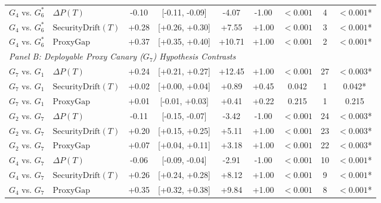 \documentclass[conference]{IEEEtran}
\begin{document}
\begin{table}[t]
\begin{tabular}{llccccccc}
$G_4$ vs. $G_6^*$ & $\Delta P(T)$ & -0.10 & [-0.11, -0.09] & -4.07 & -1.00 & $<0.001$ & 4 & \textbf{$<0.001$}* \\
$G_4$ vs. $G_6^*$ & $\text{SecurityDrift}(T)$ & +0.28 & [+0.26, +0.30] & +7.55 & +1.00 & $<0.001$ & 3 & \textbf{$<0.001$}* \\
$G_4$ vs. $G_6^*$ & $\text{ProxyGap}$ & +0.37 & [+0.35, +0.40] & +10.71 & +1.00 & $<0.001$ & 2 & \textbf{$<0.001$}* \\
\midrule
\multicolumn{9}{l}{\textit{Panel B: Deployable Proxy Canary ($G_7$) Hypothesis Contrasts}} \\
\midrule
$G_7$ vs. $G_1$ & $\Delta P(T)$ & +0.24 & [+0.21, +0.27] & +12.45 & +1.00 & $<0.001$ & 27 & \textbf{$<0.003$}* \\
$G_7$ vs. $G_1$ & $\text{SecurityDrift}(T)$ & +0.02 & [+0.00, +0.04] & +0.89 & +0.45 & 0.042 & 1 & 0.042* \\
$G_7$ vs. $G_1$ & $\text{ProxyGap}$ & +0.01 & [-0.01, +0.03] & +0.41 & +0.22 & 0.215 & 1 & 0.215 \\
$G_2$ vs. $G_7$ & $\Delta P(T)$ & -0.11 & [-0.15, -0.07] & -3.42 & -1.00 & $<0.001$ & 24 & \textbf{$<0.003$}* \\
$G_2$ vs. $G_7$ & $\text{SecurityDrift}(T)$ & +0.20 & [+0.15, +0.25] & +5.11 & +1.00 & $<0.001$ & 23 & \textbf{$<0.003$}* \\
$G_2$ vs. $G_7$ & $\text{ProxyGap}$ & +0.07 & [+0.04, +0.11] & +3.18 & +1.00 & $<0.001$ & 22 & \textbf{$<0.003$}* \\
$G_4$ vs. $G_7$ & $\Delta P(T)$ & -0.06 & [-0.09, -0.04] & -2.91 & -1.00 & $<0.001$ & 10 & \textbf{$<0.001$}* \\
$G_4$ vs. $G_7$ & $\text{SecurityDrift}(T)$ & +0.26 & [+0.24, +0.28] & +8.12 & +1.00 & $<0.001$ & 9 & \textbf{$<0.001$}* \\
$G_4$ vs. $G_7$ & $\text{ProxyGap}$ & +0.35 & [+0.32, +0.38] & +9.84 & +1.00 & $<0.001$ & 8 & \textbf{$<0.001$}* \\
\bottomrule
\end{tabular}
\end{table}



\end{document}
